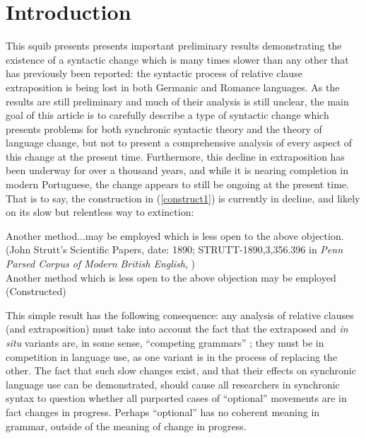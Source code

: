 \section{Introduction}
\label{intro}
This squib presents presents important preliminary results demonstrating the existence of a syntactic change which is many times slower than any other that has previously been reported: the syntactic process of relative clause extraposition is being lost in both Germanic and Romance languages.
As the results are still preliminary and much of their analysis is still unclear, the main goal of this article is to carefully describe a type of syntactic change which presents problems for both synchronic syntactic theory and the theory of language change, but not to present a comprehensive analysis of every aspect of this change at the present time.
Furthermore, this decline in extraposition has been underway for over a thousand years, and while it is nearing completion in modern Portuguese, the change appears to still be ongoing at the present time. That is to say, the construction in (\ref{construct1}) is currently in decline, and likely on its slow but relentless way to extinction:

\begin{exe}
    \ex %
    \begin{xlist}
         \ex \label{construct1} Another method...may be employed which is less open to the above objection.\\
         (John Strutt's Scientific Papers, date: 1890; STRUTT-1890,3,356.396 in \textsl{Penn Parsed Corpus of Modern British English}, \citealt{ppcmbe})\\
         \ex \label{construct2} Another method which is less open to the above objection may be employed\\
         (Constructed)
        \end{xlist}
\end{exe}


This simple result has the following consequence: any analysis of relative clauses (and extraposition) must take into account the fact that the extraposed and \textsl{in situ} variants are, in some sense, ``competing grammars'' \citep[in the sense of][inter alia]{kroch1989, kroch1994}; they must be in competition in language use, as one variant is in the process of replacing the other.
The fact that such slow changes exist, and that their effects on synchronic language use can be demonstrated, should cause all researchers in synchronic syntax to question whether all purported cases of ``optional'' movements are in fact changes in progress.
Perhaps ``optional'' has no coherent meaning in grammar, outside of the meaning of change in progress.

